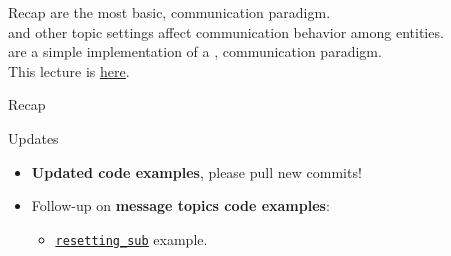 
\begin{frame}{Recap}
 are the most basic,  communication paradigm.\\
\bigskip
{} and other topic settings affect communication behavior among entities.\\
\bigskip
{} are a simple implementation of a ,  communication paradigm.\\
\bigskip
This lecture is \href{https://github.com/robmasocco/DAFN24_Robotics_4}{\color{blue}\underline{here}}.
\end{frame}
\begin{frame}{Recap}
  \begin{block}{Updates}
    \begin{itemize}
      \item \textbf{Updated code examples}, please pull new commits!
      \item Follow-up on \textbf{message topics code examples}:
      \begin{itemize}
        \item \href{https://github.com/IntelligentSystemsLabUTV/ros2-examples/blob/humble/src/cpp/topic_pubsub_cpp/src/resetting_sub.cpp}{\color{blue}\underline{\texttt{resetting\_sub}}} example.
      \end{itemize}
    \end{itemize}
  \end{block}
\end{frame}
